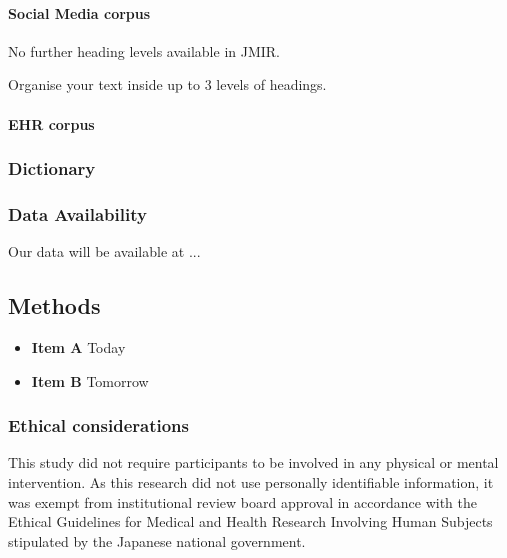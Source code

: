 \documentclass[12pt]{article}
\begin{document}

\paragraph{Social Media corpus}  %

No further heading levels available in JMIR.

Organise your text inside up to 3 levels of headings.

\paragraph{EHR corpus}  %

\subsubsection{Dictionary}  %

\subsubsection{Data Availability} %

Our data will be available at ...

\subsection{Methods}

\begin{itemize}  %
    \item \textbf{Item A} Today
    \item \textbf{Item B} Tomorrow
\end{itemize}

\subsubsection{Ethical considerations}

This study did not require participants to be involved in any physical or mental intervention. 
As this research did not use personally identifiable information, it was exempt from institutional review board approval in accordance with the Ethical Guidelines for Medical and Health Research Involving Human Subjects stipulated by the Japanese national government.
\end{document}
